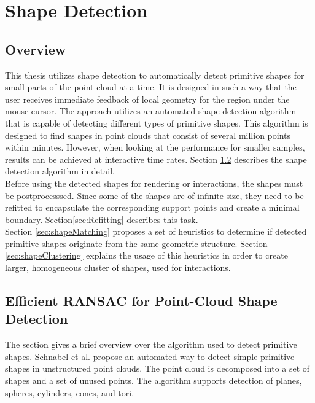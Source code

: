 \chapter{Shape Detection}
\label{chap:shapeDetection}


\section{Overview}

This thesis utilizes shape detection to automatically detect primitive shapes for small parts of the point cloud at a time. It is designed in such a way that the user receives immediate feedback of local geometry for the region under the mouse cursor. The approach utilizes an automated shape detection algorithm that is capable of detecting different types of primitive shapes. This algorithm is designed to find shapes in point clouds that consist of several million points within minutes. However, when looking at the performance for smaller samples, results can be achieved at interactive time rates. Section \ref{sec:schnabel} describes the shape detection algorithm in detail. 
\\

Before using the detected shapes for rendering or interactions, the shapes must be postprocesssed. Since some of the shapes are of infinite size, they need to be refitted to encapsulate the corresponding support points and create a minimal boundary. Section\ref{sec:Refitting} describes this task. 
\\

Section \ref{sec:shapeMatching} proposes a set of heuristics to determine if detected primitive shapes originate from the same geometric structure. Section \ref{sec:shapeClustering} explains the usage of this heuristics in order to create larger, homogeneous cluster of shapes, used for interactions. 
 

\section{Efficient RANSAC for Point-Cloud Shape Detection}
\label{sec:schnabel}

The section gives a brief overview over the algorithm used to detect primitive shapes. 
Schnabel et al.\cite{schnabel-2007-efficient} propose an automated way to detect simple primitive shapes in unstructured point clouds. The point cloud is decomposed into a set of shapes and a set of unused points. The algorithm supports detection of planes, spheres, cylinders, cones, and tori. 

